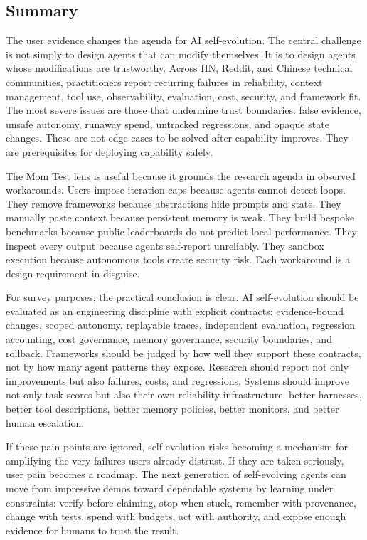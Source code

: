 \subsection{Summary}
\label{subsec:painpoints-summary}

The user evidence changes the agenda for AI self-evolution. The central challenge is not simply to design agents that can modify themselves. It is to design agents whose modifications are trustworthy. Across HN, Reddit, and Chinese technical communities, practitioners report recurring failures in reliability, context management, tool use, observability, evaluation, cost, security, and framework fit. The most severe issues are those that undermine trust boundaries: false evidence, unsafe autonomy, runaway spend, untracked regressions, and opaque state changes. These are not edge cases to be solved after capability improves. They are prerequisites for deploying capability safely.

The Mom Test lens is useful because it grounds the research agenda in observed workarounds. Users impose iteration caps because agents cannot detect loops. They remove frameworks because abstractions hide prompts and state. They manually paste context because persistent memory is weak. They build bespoke benchmarks because public leaderboards do not predict local performance. They inspect every output because agents self-report unreliably. They sandbox execution because autonomous tools create security risk. Each workaround is a design requirement in disguise.

For survey purposes, the practical conclusion is clear. AI self-evolution should be evaluated as an engineering discipline with explicit contracts: evidence-bound changes, scoped autonomy, replayable traces, independent evaluation, regression accounting, cost governance, memory governance, security boundaries, and rollback. Frameworks should be judged by how well they support these contracts, not by how many agent patterns they expose. Research should report not only improvements but also failures, costs, and regressions. Systems should improve not only task scores but also their own reliability infrastructure: better harnesses, better tool descriptions, better memory policies, better monitors, and better human escalation.

If these pain points are ignored, self-evolution risks becoming a mechanism for amplifying the very failures users already distrust. If they are taken seriously, user pain becomes a roadmap. The next generation of self-evolving agents can move from impressive demos toward dependable systems by learning under constraints: verify before claiming, stop when stuck, remember with provenance, change with tests, spend with budgets, act with authority, and expose enough evidence for humans to trust the result.
